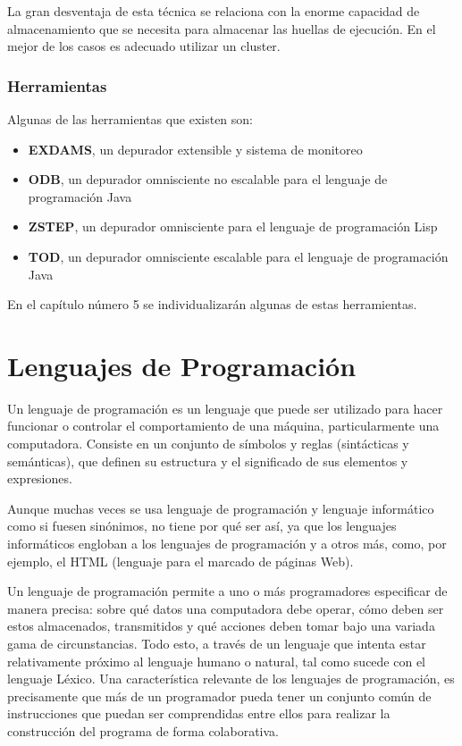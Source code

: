\documentclass[12pt,legalpaper]{report}
\begin{document}
La gran desventaja de esta técnica se relaciona con la enorme capacidad de almacenamiento que se necesita para almacenar las huellas de ejecución.  En el mejor de los casos es adecuado utilizar un cluster.

			\subsubsection{Herramientas}

Algunas de las herramientas que existen son:
\begin{itemize}
	\item \textbf{EXDAMS}, un depurador extensible y sistema de monitoreo
	\item \textbf{ODB}, un depurador omnisciente no escalable para el lenguaje de programación Java 
	\item \textbf{ZSTEP}, un depurador omnisciente para el lenguaje de programación Lisp
	\item \textbf{TOD}, un depurador omnisciente escalable para el lenguaje de programación Java
\end{itemize}

En el capítulo número 5 se individualizarán algunas de estas herramientas.

	\section{Lenguajes de Programación}

Un lenguaje de programación es un lenguaje que puede ser utilizado para hacer funcionar o controlar el comportamiento de una máquina, particularmente una computadora. Consiste en un conjunto de símbolos y reglas (sintácticas y semánticas), que definen su estructura y el significado de sus elementos y expresiones.

Aunque muchas veces se usa lenguaje de programación y lenguaje informático como si fuesen sinónimos, no tiene por qué ser así, ya que los lenguajes informáticos engloban a los lenguajes de programación y a otros más, como, por ejemplo, el HTML (lenguaje para el marcado de páginas Web).

Un lenguaje de programación permite a uno o más programadores especificar de manera precisa: sobre qué datos una computadora debe operar, cómo deben ser estos almacenados, transmitidos y qué acciones deben tomar bajo una variada gama de circunstancias. Todo esto, a través de un lenguaje que intenta estar relativamente próximo al lenguaje humano o natural, tal como sucede con el lenguaje Léxico. Una característica relevante de los lenguajes de programación, es precisamente que más de un programador pueda tener un conjunto común de instrucciones que puedan ser comprendidas entre ellos para realizar la construcción del programa de forma colaborativa.
\end{document}
